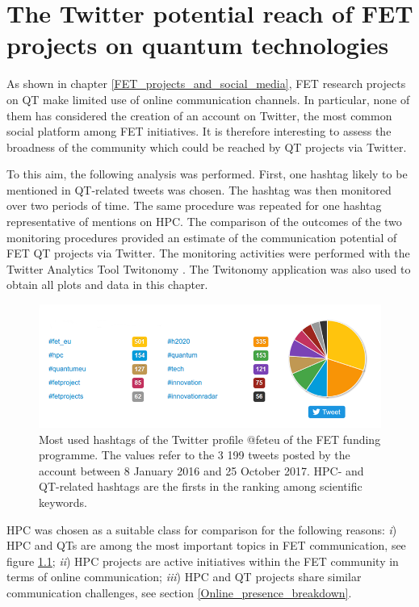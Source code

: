 \chapter{The Twitter potential reach of FET projects on quantum technologies}
As shown in chapter \ref{FET_projects_and_social_media}, FET research projects on QT make limited use of online communication channels. In particular, none of them has considered the creation of an account on Twitter, the most common social platform among FET initiatives. It is therefore interesting to assess the broadness of the community which could be reached by QT projects via Twitter.

To this aim, the following analysis was performed. First, one hashtag likely to be mentioned in QT-related tweets was chosen. The hashtag was then monitored over two periods of time. The same procedure was repeated for one hashtag representative of mentions on HPC. The comparison of the outcomes of the two monitoring procedures provided an estimate of the communication potential of FET QT projects via Twitter. The monitoring activities were performed with the Twitter Analytics Tool Twitonomy \cite{Twitonomy}. The Twitonomy application was also used to obtain all plots and data in this chapter.

\begin{figure}[!t] 
 \begin{center}
 \includegraphics[scale=0.58]{Images/Hashtags_feteu.png}
 \caption{Most used hashtags of the Twitter profile @fet\textunderscore eu of the FET funding programme. The values refer to the 3 199 tweets posted by the account between 8 January 2016 and 25 October 2017. HPC- and QT-related hashtags are the firsts in the ranking among scientific keywords.}
 \label{Hashtags_feteu}
 \end{center}
\end{figure}

HPC was chosen as a suitable class for comparison for the following reasons: \textit{i}) HPC and QTs are among the most important topics in FET communication, see figure \ref{Hashtags_feteu}; \textit{ii}) HPC projects are active initiatives within the FET community in terms of online communication; \textit{iii}) HPC and QT projects share similar communication challenges, see section \ref{Online_presence_breakdown}.

